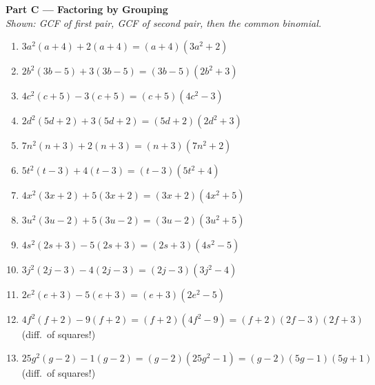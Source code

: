 \documentclass[11pt]{article}
\begin{document}
\medskip
\noindent\textbf{\textcolor{brandblue}{Part C --- Factoring by Grouping}}\\
\textit{Shown: GCF of first pair, GCF of second pair, then the common binomial.}
\begin{enumerate}[label=\textbf{C\arabic*.},leftmargin=2.6em,itemsep=5pt]
  \item $3a^2(a+4)+2(a+4)=\boxed{(a+4)(3a^2+2)}$
  \item $2b^2(3b-5)+3(3b-5)=\boxed{(3b-5)(2b^2+3)}$
  \item $4c^2(c+5)-3(c+5)=\boxed{(c+5)(4c^2-3)}$
  \item $2d^2(5d+2)+3(5d+2)=\boxed{(5d+2)(2d^2+3)}$
  \item $7n^2(n+3)+2(n+3)=\boxed{(n+3)(7n^2+2)}$
  \item $5t^2(t-3)+4(t-3)=\boxed{(t-3)(5t^2+4)}$
  \item $4x^2(3x+2)+5(3x+2)=\boxed{(3x+2)(4x^2+5)}$
  \item $3u^2(3u-2)+5(3u-2)=\boxed{(3u-2)(3u^2+5)}$
  \item $4s^2(2s+3)-5(2s+3)=\boxed{(2s+3)(4s^2-5)}$
  \item $3j^2(2j-3)-4(2j-3)=\boxed{(2j-3)(3j^2-4)}$
  \item $2e^2(e+3)-5(e+3)=\boxed{(e+3)(2e^2-5)}$
  \item $4f^2(f+2)-9(f+2)=(f+2)(4f^2-9)=\boxed{(f+2)(2f-3)(2f+3)}$ \; \small(diff.\ of squares!)
  \item $25g^2(g-2)-1(g-2)=(g-2)(25g^2-1)=\boxed{(g-2)(5g-1)(5g+1)}$ \; \small(diff.\ of squares!)
\end{enumerate}
\end{document}
